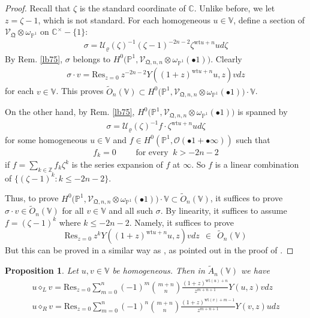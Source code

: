 \documentclass[11pt,b5paper,notitlepage]{article}
\theoremstyle{definition}
\theoremstyle{plain}
\newtheorem{pp}[df]{Proposition}
\newcommand{\mc}{\mathcal}
\newcommand{\wtd}{\widetilde}
\newcommand{\Res}{\mathrm{Res}}
\newcommand{\SV}{\mathscr{V}}
\newcommand{\scr}{\mathscr}
\newcommand{\blt}{\bullet}
\newcommand{\Vbb}{\mathbb V}
\newcommand{\Cbb}{\mathbb C}
\newcommand{\Zbb}{\mathbb Z}
\newcommand{\Pbb}{\mathbb P}
\newcommand{\wt}{\mathrm{wt}}
\newcommand{\<}{\left\langle}
\renewcommand{\>}{\right\rangle}
\newcommand{\MU}{\mathcal{U}}
\newcommand{\fq}{{\mathfrak Q}}
\numberwithin{equation}{subsection}
\begin{document}
\begin{proof}
Recall that $\zeta$ is the standard coordinate of $\Cbb$. Unlike before, we let $z=\zeta-1$, which is not standard. For each homogeneous $u\in\Vbb$, define a section of $\scr V_\fq\otimes\omega_{\Pbb^1}$ on $\Cbb^\times-\{1\}$:
\begin{align}
\sigma=\MU_\varrho(\zeta)^{-1}(\zeta-1)^{-2n-2}\zeta^{\wt u+n}u d\zeta
\end{align}
By Rem. \ref{lb75}, $\sigma$ belongs to $H^0\big(\Pbb^1, \SV_{\fq,n,n}\otimes \omega_{\Pbb^1}(\bullet 1)\big)$. Clearly
\begin{align}
\sigma\cdot v=\Res_{z=0}~z^{-2n-2}Y((1+z)^{\wt u+n}u,z)vdz
\end{align}
for each $v\in\Vbb$. This proves $\wtd O_n(\Vbb)\subset H^0\big(\Pbb^1, \SV_{\fq,n,n}\otimes \omega_{\Pbb^1}(\bullet 1)\big)\cdot\Vbb$.



On the other hand, by Rem. \ref{lb75}, $H^0\big(\Pbb^1, \SV_{\fq,n,n}\otimes \omega_{\Pbb^1}(\bullet 1)\big)$ is spanned by
\begin{align*}
\sigma= \MU_\varrho(\zeta)^{-1} f\cdot\zeta^{\wt u+n}u d\zeta
\end{align*}
for some homogeneous $u\in \Vbb$ and $f\in H^0(\Pbb^1,\mc O(\blt 1+\blt\infty))$ such that 
\begin{align}
f_k=0\qquad \text{ for every } ~k>-2n-2
\end{align}
if $f=\sum_{k\in\Zbb}f_k\zeta^k$ is the series expansion of $f$ at $\infty$. So $f$ is a linear combination of $\{(\zeta-1)^k:k\leq -2n-2\}$. 

Thus, to prove $H^0\big(\Pbb^1, \SV_{\fq,n,n}\otimes \omega_{\Pbb^1}(\bullet 1)\big)\cdot\Vbb\subset\wtd O_n(\Vbb)$, it suffices to prove $\sigma\cdot v\in\wtd O_n(\Vbb)$ for all $v\in\Vbb$ and all such $\sigma$. By linearity, it suffices to assume $f=(\zeta-1)^k$ where $k\leq -2n-2$. Namely, it suffices to prove
    \begin{equation*}
    \Res_{z=0} ~z^k Y((1+z)^{\wt u+n}u,z)vdz ~~ \in ~~\wtd O_n(\Vbb)
    \end{equation*}
But this can be proved in a similar way as \cite[Lem. 2.1.2]{Zhu-modular-invariance}, as pointed out in the proof of \cite[Lem. 2.1]{DLM-Zhu}.
\end{proof}



\begin{pp}
Let $u,v\in\Vbb$ be homogeneous. Then in $\wtd A_n(\Vbb)$ we have
\begin{subequations}
\begin{gather}
u\diamond_L v=\Res_{z=0}\sum_{m=0}^n (-1)^m \binom{m+n}{n}\frac{(1+z)^{\wt(u)+n}}{z^{m+n+1}}Y(u,z)v dz \label{eq163}\\
u\diamond_R v=\Res_{z=0}\sum_{m=0}^n (-1)^n \binom{m+n}{n}\frac{(1+z)^{\wt(v)+m-1}}{z^{m+n+1}}Y(v,z)u dz  \label{eq164}
\end{gather}
\end{subequations}
\end{pp}
\end{document}
